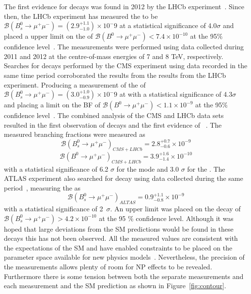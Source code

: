 The first evidence for \bsmumu decays was found in 2012 by the LHCb experiment~\cite{Aaij:2012nna}. Since then,
the LHCb experiment has measured the \bsmumu \BF to be $\mathcal{B}(B^{0}_{s} \to \mu^+ \mu^-) = (2.9^{+1.1}_{-1.0})\times 10^-9$ at a statistical significance of 4.0$\sigma$ and placed a upper limit on the \bdmumu \BF of $\mathcal{B}(B^{0} \to \mu^+ \mu^-) < 7.4 \times 10^{-10}$ at the 95$\%$ confidence level~\cite{Aaij:2013aka}. The measurements were performed using data collected during 2011 and 2012 at the centre-of-mass energies of 7 and 8 TeV, respectively. Searches for \bmumu decays performed by the CMS experiment using data recorded in the same time period corroborated the results from the results from the LHCb experiment. Producing a measurement of the \bsmumu \BF of $\mathcal{B}(B^{0}_{s} \to \mu^+ \mu^-) = (3.0^{+1.0}_{-0.9})\times 10^-9$ at with a statistical significance of 4.3$\sigma$ and placing a limit on the \bdmumu BF of $\mathcal{B}(B^{0} \to \mu^+ \mu^-) < 1.1 \times 10^{-9}$ at the 95$\%$ confidence level~\cite{Chatrchyan:2013bka}. 
The combined analysis of the CMS and LHCb data sets resulted in the first observation of \bsmumu decays and the first evidence of \bdmumu~\cite{CMS:2014xfa}. The measured branching fractions were measured as
\begin{equation}
\mathcal{B}(B^{0}_{s} \to \mu^+ \mu^-)_{CMS + LHCb}  = 2.8^{+0.7}_{-0.6} \times 10^{-9}
\end{equation}
\begin{equation}
\mathcal{B}(B^{0} \to \mu^+ \mu^-)_{CMS + LHCb}  = 3.9^{+1.6}_{-1.4} \times 10^{-10}
\end{equation}
with a statistical significance of 6.2 $\sigma$ for the \bs mode and 3.0 $\sigma$ for the \bd. The ATLAS experiment also searched for \bmumu decay using data collected during the same period~\cite{Aaboud:2016ire}, measuring the \bsmumu \BF as 
\begin{equation}
\mathcal{B}(B^{0}_{s} \to \mu^+ \mu^-)_{ALTAS}  = 0.9^{+1.1}_{-0.8} \times 10^{-9}
\end{equation}
with a statistical significance of 2~$\sigma$. An upper limit was placed on the \bdmumu decay of $\mathcal{B}(B^{0}_{s} \to \mu^+ \mu^-) >4.2 \times 10^{-10}$ at the 95 $\%$ confidence level.
Although it was hoped that large deviations from the SM predictions would be found in these decays this has not been observed. 
All the measured values are consistent with the expectations of the SM and have enabled constraints to be placed on the parameter space available for new physics models~\cite{}. Nevertheless, the precision of the measurements allows plenty of room for NP effects to be revealed. Furthermore there is some tension between both the separate measurements and each measurement and the SM prediction as shown in Figure~\ref{fig:contour}. 
